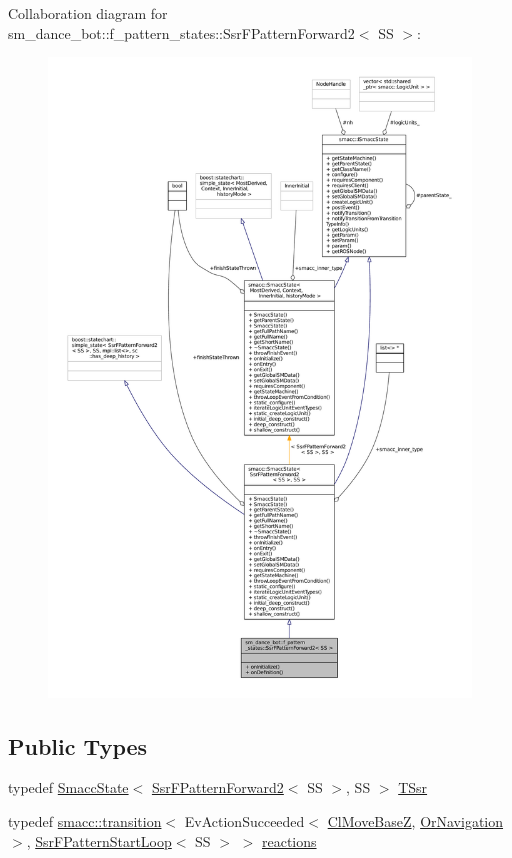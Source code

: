 Collaboration diagram for sm\+\_\+dance\+\_\+bot\+:\+:f\+\_\+pattern\+\_\+states\+:\+:Ssr\+F\+Pattern\+Forward2$<$ SS $>$\+:
\nopagebreak
\begin{figure}[H]
\begin{center}
\leavevmode
\includegraphics[width=350pt]{structsm__dance__bot_1_1f__pattern__states_1_1SsrFPatternForward2__coll__graph}
\end{center}
\end{figure}
\subsection*{Public Types}
\begin{DoxyCompactItemize}
\item 
typedef \hyperlink{classSmaccState}{Smacc\+State}$<$ \hyperlink{structsm__dance__bot_1_1f__pattern__states_1_1SsrFPatternForward2}{Ssr\+F\+Pattern\+Forward2}$<$ SS $>$, SS $>$ \hyperlink{structsm__dance__bot_1_1f__pattern__states_1_1SsrFPatternForward2_a79c9e4c2ac34bbc1b33ff9f7b7e0080a}{T\+Ssr}
\item 
typedef \hyperlink{classsmacc_1_1transition}{smacc\+::transition}$<$ Ev\+Action\+Succeeded$<$ \hyperlink{classmove__base__z__client_1_1ClMoveBaseZ}{Cl\+Move\+BaseZ}, \hyperlink{classsm__dance__bot_1_1OrNavigation}{Or\+Navigation} $>$, \hyperlink{structsm__dance__bot_1_1f__pattern__states_1_1SsrFPatternStartLoop}{Ssr\+F\+Pattern\+Start\+Loop}$<$ SS $>$ $>$ \hyperlink{structsm__dance__bot_1_1f__pattern__states_1_1SsrFPatternForward2_a1e795a04adad807d27f639d8b6ec24f0}{reactions}
\end{DoxyCompactItemize}
